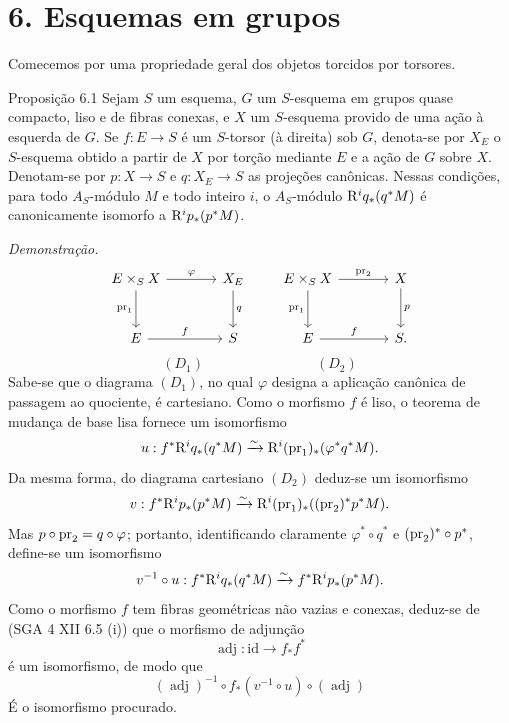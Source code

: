 \section*{6. Esquemas em grupos}

Comecemos por uma propriedade geral dos objetos torcidos por torsores.

\begin{statement}{Proposição 6.1}
Sejam $S$ um esquema, $G$ um $S$-esquema em grupos quase compacto, liso e de fibras conexas, e $X$ um $S$-esquema provido de uma ação à esquerda de $G$. Se $f:E\to S$ é um $S$-torsor (à direita) sob $G$, denota-se por $X_E$ o $S$-esquema obtido a partir de $X$ por torção mediante $E$ e a ação de $G$ sobre $X$. Denotam-se por $p:X\to S$ e $q:X_E\to S$ as projeções canônicas. Nessas condições, para todo $A_S$-módulo $M$ e todo inteiro $i$, o $A_S$-módulo $\mathrm{R}^iq_*(q^*M)$ é canonicamente isomorfo a $\mathrm{R}^ip_*(p^*M)$.
\end{statement}

\emph{Demonstração.}
\[
\begin{tikzcd}[column sep=large,row sep=large]
E\times_S X \arrow[r,"\varphi"] \arrow[d,"\pr_1"'] & X_E \arrow[d,"q"]\\
E \arrow[r,"f"] & S
\end{tikzcd}
\qquad
\begin{tikzcd}[column sep=large,row sep=large]
E\times_S X \arrow[r,"\pr_2"] \arrow[d,"\pr_1"'] & X \arrow[d,"p"]\\
E \arrow[r,"f"] & S .
\end{tikzcd}
\]
\[
(D_1)\qquad\qquad\qquad\qquad(D_2)
\]
Sabe-se que o diagrama $(D_1)$, no qual $\varphi$ designa a aplicação canônica de passagem ao quociente, é cartesiano. Como o morfismo $f$ é liso, o teorema de mudança de base lisa fornece um isomorfismo
\[
u:f^*\mathrm{R}^iq_*(q^*M)\xrightarrow{\sim}\mathrm{R}^i(\operatorname{pr}_1)_*(\varphi^*q^*M).
\]
Da mesma forma, do diagrama cartesiano $(D_2)$ deduz-se um isomorfismo
\[
v:f^*\mathrm{R}^ip_*(p^*M)\xrightarrow{\sim}\mathrm{R}^i(\operatorname{pr}_1)_*((\operatorname{pr}_2)^*p^*M).
\]
Mas $p\circ\operatorname{pr}_2=q\circ\varphi$; portanto, identificando claramente $\varphi^*\circ q^*$ e $(\operatorname{pr}_2)^*\circ p^*$, define-se um isomorfismo
\[
v^{-1}\circ u:f^*\mathrm{R}^iq_*(q^*M)\xrightarrow{\sim} f^*\mathrm{R}^ip_*(p^*M).
\]
Como o morfismo $f$ tem fibras geométricas não vazias e conexas, deduz-se de (SGA 4 XII 6.5 (i)) que o morfismo de adjunção
\[
\operatorname{adj}:\mathrm{id}\to f_*f^*
\]
é um isomorfismo, de modo que
\[
(\operatorname{adj})^{-1}\circ f_*(v^{-1}\circ u)\circ(\operatorname{adj})
\]
É o isomorfismo procurado.
